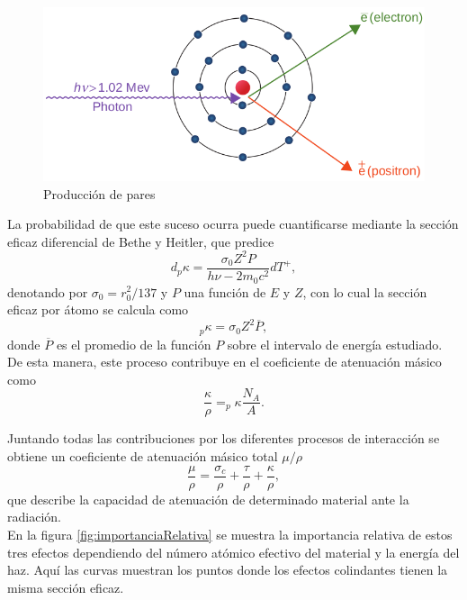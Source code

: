\begin{figure}[H]
	\centering
	\includegraphics[width=0.7\linewidth]{images/produccionPares.png}
	\caption{Producción de pares \cite{khan2014the}}
	\label{fig:Pares}
\end{figure}

La probabilidad de que este suceso ocurra puede cuantificarse mediante la sección eficaz diferencial de Bethe y Heitler, que predice 
\begin{equation}
	d_{p}\kappa=\frac{\sigma_0 Z^2 P}{h\nu -2m_0c^2}dT^{+}, 
\end{equation}
denotando por $\sigma_0=r_{0}^2/137$ y $P$ una función de $E$ y $Z$, con lo cual la sección eficaz por átomo se calcula como
\begin{equation}
	_{p}\kappa=\sigma_0Z^2\overline{P},
\end{equation}
donde $\overline{P}$ es el promedio de la función $P$ sobre el intervalo de energía estudiado.\\

De esta manera, este proceso contribuye en el coeficiente de atenuación másico como
\begin{equation}
	\frac{\kappa}{\rho}=_{p}\kappa\frac{N_A}{A}.
\end{equation}

Juntando todas las contribuciones por los diferentes procesos de interacción se obtiene un coeficiente de atenuación másico total $\mu/\rho$
\begin{equation}
	\frac{\mu}{\rho}=\frac{\sigma_c}{\rho}+\frac{\tau}{\rho}+\frac{\kappa}{\rho},
\end{equation}
que describe la capacidad de atenuación de determinado material ante la radiación.\\

En la figura \ref{fig:importanciaRelativa} se muestra la importancia relativa de estos tres efectos dependiendo del número atómico efectivo del material y la energía del haz. Aquí las curvas muestran los puntos donde los efectos colindantes tienen la misma sección eficaz.


